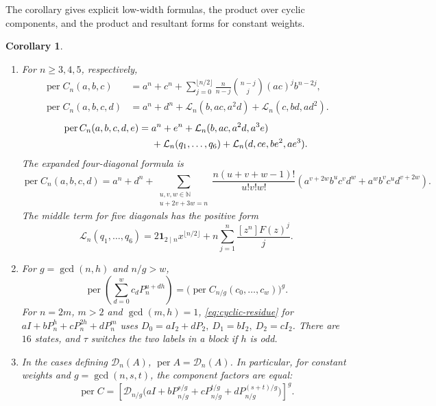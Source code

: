 \documentclass[11pt,reqno]{amsart}
\newtheorem{corollary}[theorem]{Corollary}
\theoremstyle{remark}
\numberwithin{equation}{section}
\newcommand{\per}{\operatorname{per}}
\newcommand{\N}{\mathbb N}
\newcommand{\cL}{\mathcal L}
\newcommand{\ind}{\mathbf 1}
\begin{document}
The corollary gives explicit low-width formulas, the product
over cyclic components, and the product and resultant forms
for constant weights.

\begin{corollary}\label{cor:circulant}
\leavevmode
\begin{enumerate}
\item For \(n\ge3,4,5\), respectively,
\begin{align}
 \per C_n(a,b,c)&=a^n+c^n+
     \sum_{j=0}^{\lfloor n/2\rfloor}
        \frac{n}{n-j}\binom{n-j}{j}(ac)^j b^{n-2j},
                                                        \label{eq:three}\\
 \per C_n(a,b,c,d)&=a^n+d^n+
                \cL_n(b,ac,a^2d)+\cL_n(c,bd,ad^2).
                                                        \label{eq:four}
\end{align}
\begin{align}
 \per C_n(a,b,c,d,e)={}&a^n+e^n+\cL_n(b,ac,a^2d,a^3e)\notag\\
             &+\cL_n(q_1,\ldots,q_6)+\cL_n(d,ce,be^2,ae^3).
                                                        \label{eq:five}
\end{align}
The expanded four-diagonal formula is
\begin{equation}\label{eq:four-expanded}
 \per C_n(a,b,c,d)=a^n+d^n+
 \sum_{\substack{u,v,w\in\N\\u+2v+3w=n}}\frac{n(u+v+w-1)!}{u!v!w!}
 \left(a^{v+2w}b^uc^vd^w+a^wb^vc^ud^{v+2w}\right).
\end{equation}
The middle term for five diagonals has the positive form
\begin{equation}\label{eq:positive-cyclic}
 \cL_n(q_1,\ldots,q_6)=2\ind_{2\mid n}x^{\lfloor n/2\rfloor}
       +n\sum_{j=1}^n\frac{[z^n]F(z)^j}{j}.
\end{equation}

\item For \(g=\gcd(n,h)\) and \(n/g>w\),
\begin{equation}\label{eq:progression}
 \per\left(\sum_{d=0}^w c_dP_n^{u+dh}\right)
       =\bigl(\per C_{n/g}(c_0,\ldots,c_w)\bigr)^g .
\end{equation}
For \(n=2m\), \(m>2\) and \(\gcd(m,h)=1\),
\eqref{eq:cyclic-residue} for \(aI+bP_n^h+cP_n^{2h}+dP_n^m\)
uses \(D_0=aI_2+dP_2,\ D_1=bI_2,\ D_2=cI_2\). There are \(16\)
states, and \(\tau\) switches the two labels in a block
if \(h\) is odd.

\item In the cases defining \(\mathcal D_n(A)\),
\(\per A=\mathcal D_n(A)\). In particular, for constant
weights and \(g=\gcd(n,s,t)\), the component factors are equal:
\[
 \per C=\left[\mathcal D_{n/g}
   \bigl(aI+bP_{n/g}^{s/g}+cP_{n/g}^{t/g}
                         +dP_{n/g}^{(s+t)/g}\bigr)\right]^g.
\]


\end{enumerate}
\end{corollary}
\end{document}

